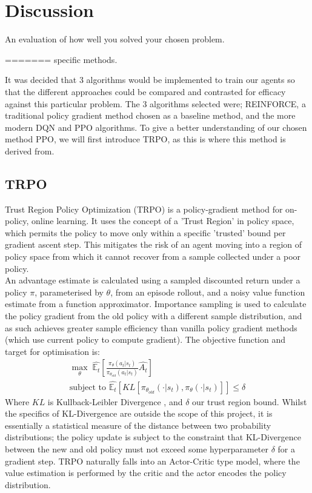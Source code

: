 \documentclass{article}
\begin{document}
\section{Discussion}
An evaluation of how well you solved your chosen problem.

=======
specific methods.\\\newline

It was decided that 3 algorithms would be implemented to train our agents so that the different approaches could be compared and contrasted for efficacy against this particular problem. The 3 algorithms selected were; REINFORCE, a traditional policy gradient method chosen as a baseline method, and the more modern DQN and PPO algorithms. To give a better understanding of our chosen method PPO, we will first introduce TRPO, as this is where this method is derived from. 

\subsection{TRPO}
Trust Region Policy Optimization (TRPO) \citep{pmlr-v37-schulman15} is a policy-gradient method for on-policy, online learning. It uses the concept of a 'Trust Region' in policy space, which permits the policy to move only within a specific 'trusted' bound per gradient ascent step. This mitigates the risk of an agent moving into a region of policy space from which it cannot recover from a sample collected under a poor policy. \\\newline
An advantage estimate is calculated using a sampled discounted return under a policy $\pi$, parameterised by $\theta$, from an episode rollout, and a noisy value function estimate from a function approximator. Importance sampling is used to calculate the policy gradient from the old policy with a different sample distribution, and as such achieves greater sample efficiency than vanilla policy gradient methods (which use current policy to compute gradient). The objective function and target for optimisation is:
\begin{gather}
    \max_\theta\; \hat{\mathbb{E}_t}\left[\frac{\pi_\theta(a_t | s_t)}{\pi_{\theta_{old}}(a_t | s_t)}\hat{A_t}\right]\\
\text{subject to } \hat{\mathbb{E}_t}\left[KL\left[\pi_{\theta_{old}}(\cdot | s_t),\pi_\theta(\cdot|s_t)\right]\right] \leq \delta
\end{gather}
Where $KL$ is Kullback-Leibler Divergence \citep{Joyce2011}, and $\delta$ our trust region bound. Whilst the specifics of KL-Divergence are outside the scope of this project, it is essentially a statistical measure of the distance between two probability distributions; the policy update is subject to the constraint that KL-Divergence between the new and old policy must not exceed some hyperparameter $\delta$ for a gradient step. TRPO naturally falls into an Actor-Critic type model, where the value estimation is performed by the critic and the actor encodes the policy distribution. 
\end{document}
